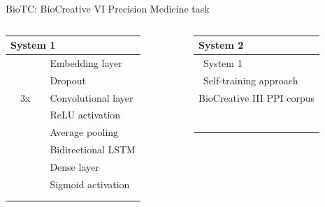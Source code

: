 \begin{frame}[t]{BioTC: BioCreative VI Precision Medicine task}
\begin{columns}[t,totalwidth=\textwidth]
\begin{column}{0.20\textwidth}
\begin{tabular}{l@{\hskip0pt}l@{\hskip0pt}l@{\hskip0pt}l}
\multicolumn{4}{l}{\minorscriptsize\textbf{System 1}}\\
\midrule
&                         & \hphantom{0} & Embedding layer\\
&                         &              & Dropout\\
& \multicolumn{1}{l|}{3x} &              & Convolutional layer\\
& \multicolumn{1}{l|}{}   &              & ReLU activation\\
& \multicolumn{1}{l|}{}   &              & Average pooling\\
&                         &              & Bidirectional LSTM\\%
&                         &              & Dense layer\\
&                         &              & Sigmoid activation\\%
\\
\\
\end{tabular}
\end{column}

\newcommand{\mybullet}{\raisebox{0.6pt}{$\bullet$}}
\begin{column}{0.20\textwidth}
\begin{tabular}{l}
{\minorscriptsize\textbf{System 2}}\\
\midrule
\mybullet\ System 1\\
\mybullet\ Self-training approach\\
\hphantom{\mybullet\ }BioCreative III PPI corpus\\
\\
\\
\\
\\
\\
\\
\\
\end{tabular}
\end{column}


\end{columns}
\end{frame}
